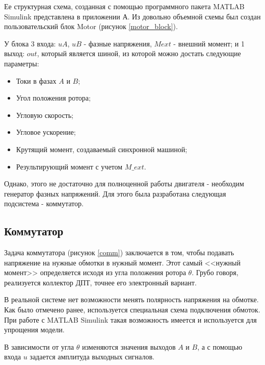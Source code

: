 Ее структурная схема, созданная с помощью программного пакета
MATLAB Simulink представлена в приложении А. %
Из довольно объемной схемы был создан пользовательский блок Motor (рисунок \ref{motor_block}).

У блока 3 входа: $uA$, $uB$ - фазные напряжения, $Mext$ - внешний момент; 
и 1 выход: $out$, который является шиной, из которой можно достать следующие параметры:

\begin{itemize}
  \item Токи в фазах $A$ и $B$;
  \item Угол положения ротора;
  \item Угловую скорость;
  \item Угловое ускорение;
  \item Крутящий момент, создаваемый синхронной машиной;
  \item Результирующий момент с учетом $M\_ext$.
\end{itemize}


Однако, этого не достаточно для полноценной работы двигателя - необходим генератор фазных напряжений.
Для этого была разработана следующая подсистема - коммутатор.

\subsection{Коммутатор}

Задача коммутатора (рисунок \ref{comm}) заключается в том, чтобы подавать напряжение на нужные обмотки в нужный момент.
Этот самый <<нужный момент>> определяется исходя из угла положения ротора $\theta$. Грубо говоря,
реализуется коллектор ДПТ, точнее его электронный вариант.

В реальной системе нет возможности менять полярность напряжения на обмотке. Как было отмечено ранее,
используется специальная схема подключения обмоток. При работе с MATLAB Simulink такая возможность имеется и
используется для упрощения модели.


В зависимости от угла $\theta$ изменяются значения выходов $A$ и $B$, а с помощью входа $u$ задается амплитуда
выходных сигналов.


